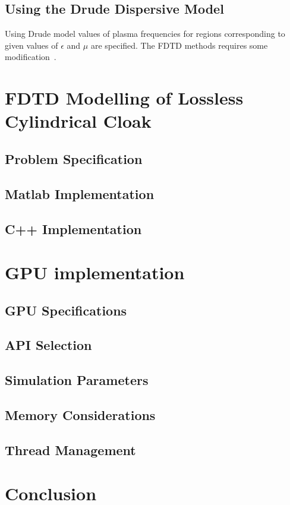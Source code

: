 \documentclass{report}
\begin{document}
\section{Using the Drude Dispersive Model}
Using Drude model values of plasma frequencies for regions corresponding to given values of $\epsilon$ and $\mu$ are specified. The FDTD methods requires some modification~\cite{Radial-Zhao}.

\chapter{FDTD Modelling of Lossless Cylindrical Cloak}
\section{Problem Specification}
\section{Matlab Implementation}
\section{C++ Implementation}

\chapter{GPU implementation}
\section{GPU Specifications}
\section{API Selection}
\section{Simulation Parameters}
\section{Memory Considerations}
\section{Thread Management}

\chapter{Conclusion}

\nocite{*}


\appendix

\end{document}
